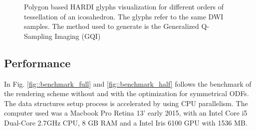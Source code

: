 \documentclass[twoside,twocolumn,10pt]{article}
\begin{document}
\begin{figure}[h]
{    \label{fig::ex_glyph16}
    }
     \caption{Polygon based HARDI glyphs visualization for different orders of tessellation of an icosahedron. The glyphs refer to the same DWI samples. The method used to generate is the Generalized Q-Sampling Imaging (GQI) \cite{yeh2010}} %
    \label{fig::ex_glyph}
\end{figure}




\subsection{Performance}

In Fig. \ref{fig::benchmark_full} and \ref{fig::benchmark_half} follows the benchmark of the rendering scheme without and with the optimization for symmetrical ODFs. The data structures setup process is accelerated by using CPU parallelism. The computer used was a Macbook Pro Retina 13' early 2015, with an Intel Core i5 Dual-Core 2.7GHz CPU, 8 GB RAM and a Intel Iris 6100 GPU with 1536 MB.
\end{document}
